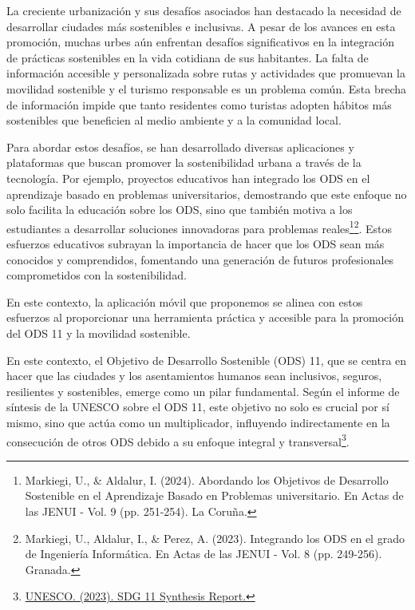 

La creciente urbanización y sus desafíos asociados han destacado la necesidad de desarrollar ciudades más sostenibles e inclusivas. A pesar de los avances en esta promoción, muchas urbes aún enfrentan desafíos significativos en la integración de prácticas sostenibles en la vida cotidiana de sus habitantes. La falta de información accesible y personalizada sobre rutas y actividades que promuevan la movilidad sostenible y el turismo responsable es un problema común. Esta brecha de información impide que tanto residentes como turistas adopten hábitos más sostenibles que beneficien al medio ambiente y a la comunidad local.


Para abordar estos desafíos, se han desarrollado diversas aplicaciones y plataformas que buscan promover la sostenibilidad urbana a través de la tecnología. Por ejemplo, proyectos educativos han integrado los ODS en el aprendizaje basado en problemas universitarios, demostrando que este enfoque no solo facilita la educación sobre los ODS, sino que también motiva a los estudiantes a desarrollar soluciones innovadoras para problemas reales\footnote{Markiegi, U., \& Aldalur, I. (2024). Abordando los Objetivos de Desarrollo Sostenible en el Aprendizaje Basado en Problemas universitario. En Actas de las JENUI - Vol. 9 (pp. 251-254). La Coruña.}\footnote{Markiegi, U., Aldalur, I., \& Perez, A. (2023). Integrando los ODS en el grado de Ingeniería Informática. En Actas de las JENUI - Vol. 8 (pp. 249-256). Granada.}. Estos esfuerzos educativos subrayan la importancia de hacer que los ODS sean más conocidos y comprendidos, fomentando una generación de futuros profesionales comprometidos con la sostenibilidad.


En este contexto, la aplicación móvil que proponemos se alinea con estos esfuerzos al proporcionar una herramienta práctica y accesible para la promoción del ODS 11 y la movilidad sostenible.

En este contexto, el Objetivo de Desarrollo Sostenible (ODS) 11, que se centra en hacer que las ciudades y los asentamientos humanos sean inclusivos, seguros, resilientes y sostenibles, emerge como un pilar fundamental. Según el informe de síntesis de la UNESCO sobre el ODS 11, este objetivo no solo es crucial por sí mismo, sino que actúa como un multiplicador, influyendo indirectamente en la consecución de otros ODS debido a su enfoque integral y transversal\footnote{\href{https://uis.unesco.org/sites/default/files/documents/sdg_11_synthesis_report_2023_v11_0_4.pdf}{UNESCO. (2023). SDG 11 Synthesis Report.}}.

